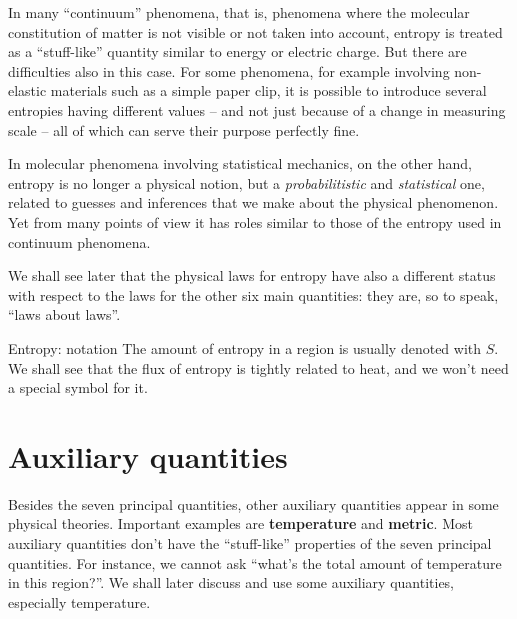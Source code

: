 \documentclass[a4paper,12pt,%
onecolumn,oneside,titlepage,%
british%
]{memoir}
\renewcommand*{\|}[1][]{\nonscript\:#1\vert\nonscript\:\mathopen{}}
\newcommand*{\yS}{S}
\begin{document}
In many \enquote{continuum} phenomena, that is, phenomena where the molecular constitution of matter is not visible or not taken into account, entropy is treated as a \enquote{stuff-like} quantity similar to energy or electric charge. But there are difficulties also in this case. For some phenomena, for example involving non-elastic materials such as a simple paper clip, it is possible to introduce several entropies having different values -- and not just because of a change in measuring scale -- all of which can serve their purpose perfectly fine.

In molecular phenomena involving statistical mechanics, on the other hand, entropy is no longer a physical notion, but a \emph{probabilitistic} and \emph{statistical} one, related to guesses and inferences that we make about the physical phenomenon. Yet from many points of view it has roles similar to those of the entropy used in continuum phenomena.

We shall see later that the physical laws for entropy have also a different status with respect to the laws for the other six main quantities: they are, so to speak, \enquote{laws about laws}.

\smallskip

\begin{definition}{Entropy: notation}
  The amount of entropy in a region is usually denoted with $\yS$. We shall see that the flux of entropy is tightly related to heat, and we won't need a special symbol for it.
\end{definition}




\section{Auxiliary quantities}
\label{sec:aux_quantities}

Besides the seven principal quantities, other auxiliary quantities appear in some physical theories. Important examples are \textbf{temperature} and \textbf{metric}. Most auxiliary quantities don't have the \enquote{stuff-like} properties of the seven principal quantities. For instance, we cannot ask \enquote{what's the total amount of temperature in this region?}. We shall later discuss and use some auxiliary quantities, especially temperature.
\end{document}

